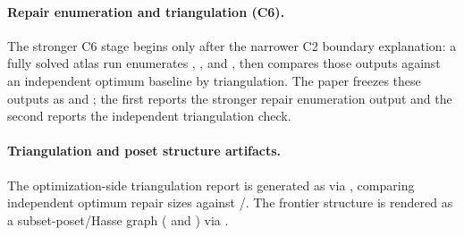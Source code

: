 

\paragraph{Repair enumeration and triangulation (C6).}
The stronger C6 stage begins only after the narrower C2 boundary explanation: a fully solved atlas run
enumerates , , and , then compares those outputs against an independent optimum baseline by triangulation.
The paper freezes these outputs as  and ; the first reports the stronger repair enumeration output and the second reports the independent triangulation check.



\paragraph{Triangulation and poset structure artifacts.}
The optimization-side triangulation report is generated as  via
, comparing independent optimum repair sizes against
/. The frontier structure is rendered as a subset-poset/Hasse graph
( and ) via .



